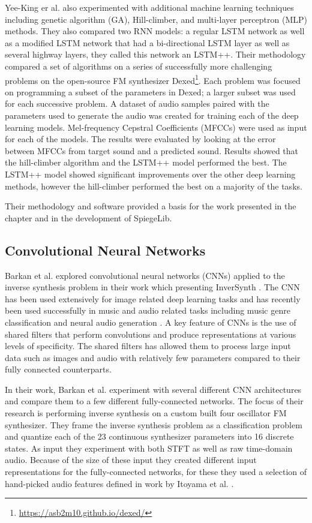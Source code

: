 Yee-King er al. also experimented with additional machine learning techniques including genetic algorithm (GA), Hill-climber, and  multi-layer perceptron (MLP) methods. They also compared two RNN models: a regular LSTM network as well as a modified LSTM network that had a bi-directional LSTM layer as well as several highway layers, they called this network an LSTM++. Their methodology compared a set of algorithms on a series of successfully more challenging problems on the open-source FM synthesizer Dexed\footnote{\url{https://asb2m10.github.io/dexed/}}. Each problem was focused on programming a subset of the parameters in Dexed; a larger subset was used for each successive problem. A dataset of audio samples paired with the parameters used to generate the audio was created for training each of the deep learning models. Mel-frequency Cepstral Coefficients (MFCCs) were used as input for each of the models. The results were evaluated by looking at the error between MFCCs from target sound and a predicted sound. Results showed that the hill-climber algorithm and the LSTM++ model performed the best. The LSTM++ model showed significant improvements over the other deep learning methods, however the hill-climber performed the best on a majority of the tasks.

Their methodology and software provided a basis for the work presented in the chapter and in the development of SpiegeLib.

\subsection{Convolutional Neural Networks}
Barkan et al. explored convolutional neural networks (CNNs) applied to the inverse synthesis problem in their work which presenting InverSynth \cite{barkan2019deep}. The CNN has been used extensively for image related deep learning tasks and has recently been used successfully in music and audio related tasks including music genre classification \cite{choi2016automatic} and neural audio generation \cite{donahue2018adversarial}. A key feature of CNNs is the use of shared filters that perform convolutions and produce representations at various levels of specificity. The shared filters has allowed them to process large input data such as images and audio with relatively few parameters compared to their fully connected counterparts. 

In their work, Barkan et al. experiment with several different CNN architectures and compare them to a few different fully-connected networks. The focus of their research is performing inverse synthesis on a custom built four oscillator FM synthesizer. They frame the inverse synthesis problem as a classification problem and quantize each of the 23 continuous synthesizer parameters into 16 discrete states. As input they experiment with both STFT as well as raw time-domain audio. Because of the size of these input they created different input representations for the fully-connected networks, for these they used a selection of hand-picked audio features defined in work by Itoyama et al. \cite{itoyama2014parameter}.

